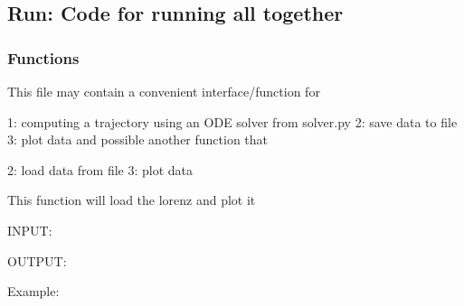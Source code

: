 \documentclass[letterpaper,10pt,english]{sphinxmanual}
\begin{document}
\subsection{Run: Code for running all together}
\label{\detokenize{Functions:run-code-for-running-all-together}}

\subsubsection{Functions}
\label{\detokenize{Functions:id5}}\label{\detokenize{Functions:module-lorenz.run}}
This file may contain a convenient interface/function for

1: computing a trajectory using an ODE solver from solver.py
2: save data to file
3: plot data
and possible another function that

2: load data from file
3: plot data

\begin{fulllineitems}
\label{\detokenize{Functions:lorenz.run.load_lorenz}}
This function will load the lorenz and plot it

INPUT:

\begin{sphinxVerbatim}[commandchars=\\\{\}]
          
        
\end{sphinxVerbatim}

OUTPUT:

\begin{sphinxVerbatim}[commandchars=\\\{\}]
  
\end{sphinxVerbatim}

Example:

\begin{sphinxVerbatim}[commandchars=\\\{\}]
 
\end{sphinxVerbatim}

\end{fulllineitems}
\end{document}

